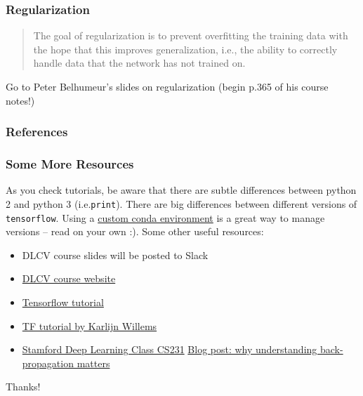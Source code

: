 \documentclass[10pt]{beamer}
\makeatletter
\newcommand*{\ie}{i.e.\@\xspace}
\makeatother
\begin{document}
\begin{frame}
	\frametitle{Regularization}
	\begin{quotation}
		The goal of regularization is to prevent overfitting the training data with the hope that this improves generalization, \ie, the ability to correctly handle data that the network has not trained on.
	\end{quotation}
	\alert{Go to Peter Belhumeur's slides on regularization (begin p.365 of his course notes!)}
\end{frame}


\begin{frame}%
	\frametitle{References}
	\renewcommand*{\bibfont}{\tiny}
	\printbibliography[heading=none]
\end{frame}

\begin{frame}
	\frametitle{Some More Resources}
	As you check tutorials, be aware that there are subtle differences between python 2 and python 3 (\ie \texttt{print}).
	There are big differences between different versions of \texttt{tensorflow}.
	Using a \href{https://uoa-eresearch.github.io/eresearch-cookbook/recipe/2014/11/20/conda/}{custom conda environment} is a great way to manage versions -- read on your own :).
	Some other useful resources:
	\begin{itemize}

		\item DLCV course slides will be posted to Slack
		\item \href{http://www.deeplearningforcomputervision.com}{DLCV course website}
		\item \href{https://www.tensorflow.org/tutorials/}{Tensorflow tutorial}
		\item \href{https://www.datacamp.com/community/tutorials/tensorflow-tutorial\#gs.tELsmK4}{TF tutorial by Karlijn Willems}
		\item \href{http://cs231n.github.io/}{Stamford Deep Learning Class CS231}
		\href{https://medium.com/@karpathy/yes-you-should-understand-backprop-e2f06eab496b}{Blog post: why understanding back-propagation matters}
	\end{itemize}
\end{frame}

\begin{frame}[standout]
  Thanks!
\end{frame}
\end{document}
